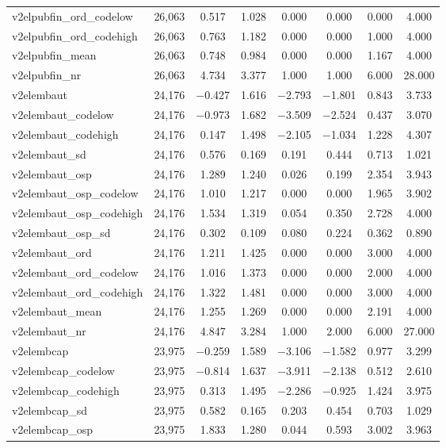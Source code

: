 \begin{table}[!htbp]
\begin{tabular}{@{\extracolsep{5pt}}lccccccc}
v2elpubfin\_ord\_codelow & 26,063 & 0.517 & 1.028 & 0.000 & 0.000 & 0.000 & 4.000 \\ 
v2elpubfin\_ord\_codehigh & 26,063 & 0.763 & 1.182 & 0.000 & 0.000 & 1.000 & 4.000 \\ 
v2elpubfin\_mean & 26,063 & 0.748 & 0.984 & 0.000 & 0.000 & 1.167 & 4.000 \\ 
v2elpubfin\_nr & 26,063 & 4.734 & 3.377 & 1.000 & 1.000 & 6.000 & 28.000 \\ 
v2elembaut & 24,176 & $-$0.427 & 1.616 & $-$2.793 & $-$1.801 & 0.843 & 3.733 \\ 
v2elembaut\_codelow & 24,176 & $-$0.973 & 1.682 & $-$3.509 & $-$2.524 & 0.437 & 3.070 \\ 
v2elembaut\_codehigh & 24,176 & 0.147 & 1.498 & $-$2.105 & $-$1.034 & 1.228 & 4.307 \\ 
v2elembaut\_sd & 24,176 & 0.576 & 0.169 & 0.191 & 0.444 & 0.713 & 1.021 \\ 
v2elembaut\_osp & 24,176 & 1.289 & 1.240 & 0.026 & 0.199 & 2.354 & 3.943 \\ 
v2elembaut\_osp\_codelow & 24,176 & 1.010 & 1.217 & 0.000 & 0.000 & 1.965 & 3.902 \\ 
v2elembaut\_osp\_codehigh & 24,176 & 1.534 & 1.319 & 0.054 & 0.350 & 2.728 & 4.000 \\ 
v2elembaut\_osp\_sd & 24,176 & 0.302 & 0.109 & 0.080 & 0.224 & 0.362 & 0.890 \\ 
v2elembaut\_ord & 24,176 & 1.211 & 1.425 & 0.000 & 0.000 & 3.000 & 4.000 \\ 
v2elembaut\_ord\_codelow & 24,176 & 1.016 & 1.373 & 0.000 & 0.000 & 2.000 & 4.000 \\ 
v2elembaut\_ord\_codehigh & 24,176 & 1.322 & 1.481 & 0.000 & 0.000 & 3.000 & 4.000 \\ 
v2elembaut\_mean & 24,176 & 1.255 & 1.269 & 0.000 & 0.000 & 2.191 & 4.000 \\ 
v2elembaut\_nr & 24,176 & 4.847 & 3.284 & 1.000 & 2.000 & 6.000 & 27.000 \\ 
v2elembcap & 23,975 & $-$0.259 & 1.589 & $-$3.106 & $-$1.582 & 0.977 & 3.299 \\ 
v2elembcap\_codelow & 23,975 & $-$0.814 & 1.637 & $-$3.911 & $-$2.138 & 0.512 & 2.610 \\ 
v2elembcap\_codehigh & 23,975 & 0.313 & 1.495 & $-$2.286 & $-$0.925 & 1.424 & 3.975 \\ 
v2elembcap\_sd & 23,975 & 0.582 & 0.165 & 0.203 & 0.454 & 0.703 & 1.029 \\ 
v2elembcap\_osp & 23,975 & 1.833 & 1.280 & 0.044 & 0.593 & 3.002 & 3.963 \\ 

\end{tabular}
\end{table}

